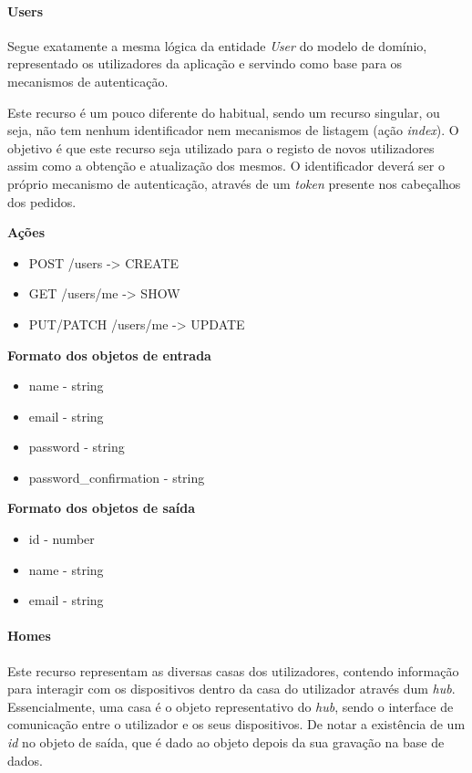 \paragraph*{Users}

Segue exatamente a mesma lógica da entidade \textit{User} do modelo de domínio, representado os utilizadores da aplicação e servindo como base para os mecanismos de autenticação.

Este recurso é um pouco diferente do habitual, sendo um recurso singular, ou seja, não tem nenhum identificador nem mecanismos de listagem (ação \textit{index}). O objetivo é que este recurso seja utilizado para o registo de novos utilizadores assim como a obtenção e atualização dos mesmos. O identificador deverá ser o próprio mecanismo de autenticação, através de um \textit{token} presente nos cabeçalhos dos pedidos.

\textbf{Ações}
\begin{itemize}
    \item POST /users -> CREATE
    \item GET /users/me -> SHOW
    \item PUT/PATCH /users/me -> UPDATE
\end{itemize}

\textbf{Formato dos objetos de entrada}
\begin{itemize}
    \item name - string
    \item email - string
    \item password - string
    \item password\_confirmation - string
\end{itemize}

\textbf{Formato dos objetos de saída}
\begin{itemize}
    \item id - number
    \item name - string
    \item email - string
\end{itemize}

\paragraph*{Homes}

Este recurso representam as diversas casas dos utilizadores, contendo informação para interagir com os dispositivos dentro da casa do utilizador através dum \textit{hub}. Essencialmente, uma casa é o objeto representativo do \textit{hub}, sendo o interface de comunicação entre o utilizador e os seus dispositivos. De notar a existência de um \textit{id} no objeto de saída, que é dado ao objeto depois da sua gravação na base de dados.

